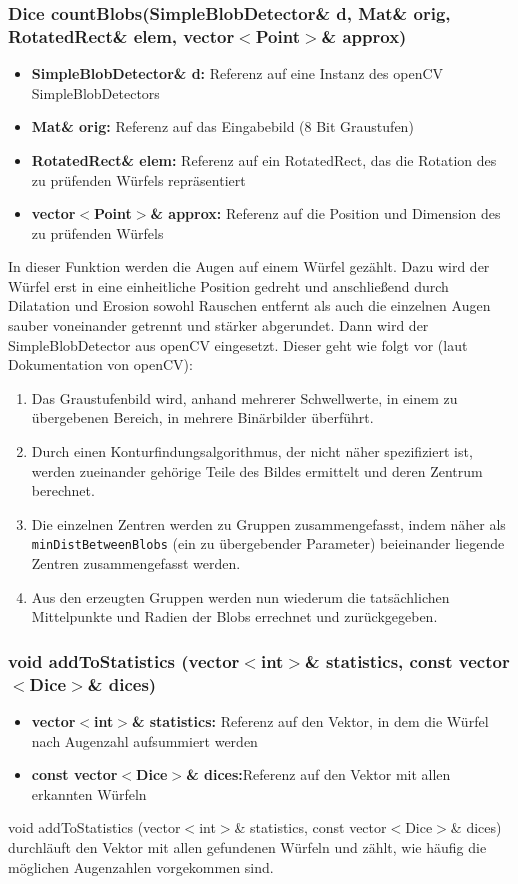 \documentclass{../Vorlage/sebDenCls}
\begin{document}
\subsubsection{Dice countBlobs(SimpleBlobDetector\& d, Mat\& orig, RotatedRect\& elem, vector$<$Point$>$\& approx)}
\begin{itemize}
	\item \textbf{SimpleBlobDetector\& d:} Referenz auf eine Instanz des openCV SimpleBlobDetectors
	\item \textbf{Mat\& orig:} Referenz auf das Eingabebild (8 Bit Graustufen)
	\item \textbf{RotatedRect\& elem:} Referenz auf ein RotatedRect, das die Rotation des zu prüfenden Würfels repräsentiert
	\item \textbf{vector$<$Point$>$\& approx:} Referenz auf die Position und Dimension des zu prüfenden Würfels
\end{itemize}
In dieser Funktion werden die Augen auf einem Würfel gezählt. Dazu wird der Würfel erst in eine einheitliche Position gedreht und anschließend durch Dilatation und Erosion sowohl Rauschen entfernt als auch die einzelnen Augen sauber voneinander getrennt und stärker abgerundet. Dann wird der SimpleBlobDetector aus openCV eingesetzt. Dieser geht wie folgt vor (laut Dokumentation von openCV):\\
\begin{enumerate}
	\item Das Graustufenbild wird, anhand mehrerer Schwellwerte, in einem zu übergebenen Bereich, in mehrere Binärbilder überführt.
	\item Durch einen Konturfindungsalgorithmus, der nicht näher spezifiziert ist, werden zueinander gehörige Teile des Bildes ermittelt und deren Zentrum berechnet.
	\item Die einzelnen Zentren werden zu Gruppen zusammengefasst, indem näher als \texttt{minDistBetweenBlobs} (ein zu übergebender Parameter) beieinander liegende Zentren zusammengefasst werden.
	\item Aus den erzeugten Gruppen werden nun wiederum die tatsächlichen Mittelpunkte und Radien der Blobs errechnet und zurückgegeben.
\end{enumerate}

\subsubsection{void addToStatistics (vector$<$int$>$\& statistics, const vector$<$Dice$>$\& dices)}
\begin{itemize}
	\item \textbf{vector$<$int$>$\& statistics:} Referenz auf den Vektor, in dem die Würfel nach Augenzahl aufsummiert werden
	\item \textbf{const vector$<$Dice$>$\& dices:}Referenz auf den Vektor mit allen erkannten Würfeln
\end{itemize}
void addToStatistics (vector$<$int$>$\& statistics, const vector$<$Dice$>$\& dices) durchläuft den Vektor mit allen gefundenen Würfeln und zählt, wie häufig die möglichen Augenzahlen vorgekommen sind.
\end{document}
